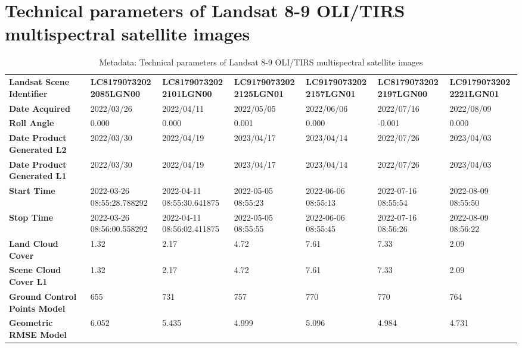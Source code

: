 \documentclass[climate,article,submit,pdftex,moreauthors]{Definitions/mdpi}
\begin{document}
\appendixstart
\appendix

\section[\appendixname~\thesection]{Technical parameters of Landsat 8-9 OLI/TIRS multispectral satellite images}

\begin{landscape}
\begin{table}
\caption{Metadata: Technical parameters of Landsat 8-9 OLI/TIRS multispectral satellite images}
 \label{tab01}
\footnotesize
\setlength\tabcolsep{2pt}
\begin{tabular}{|l|l|l|l|l|l|l|}    
      	\textbf{Landsat Scene Identifier} & \textbf{LC81790732022085LGN00} & \textbf{LC81790732022101LGN00} & \textbf{LC91790732022125LGN01} & \textbf{LC91790732022157LGN01} & \textbf{LC81790732022197LGN00} & \textbf{LC91790732022221LGN01} \\
        \textbf{Date Acquired} & 2022/03/26 & 2022/04/11 & 2022/05/05 & 2022/06/06 & 2022/07/16 & 2022/08/09 \\
        \textbf{Roll Angle} & 0.000 & 0.000 & 0.001 & 0.000 & -0.001 & 0.000 \\
        \textbf{Date Product Generated L2} & 2022/03/30 & 2022/04/19 & 2023/04/17 & 2023/04/14 & 2022/07/26 & 2023/04/03 \\
        \textbf{Date Product Generated L1} & 2022/03/30 & 2022/04/19 & 2023/04/17 & 2023/04/14 & 2022/07/26 & 2023/04/03 \\
        \textbf{Start Time} & 2022-03-26 08:55:28.788292 & 2022-04-11 08:55:30.641875 & 2022-05-05 08:55:23 & 2022-06-06 08:55:13 & 2022-07-16 08:55:54 & 2022-08-09 08:55:50 \\
        \textbf{Stop Time} & 2022-03-26 08:56:00.558292 & 2022-04-11 08:56:02.411875 & 2022-05-05 08:55:55 & 2022-06-06 08:55:45 & 2022-07-16 08:56:26 & 2022-08-09 08:56:22 \\
        \textbf{Land Cloud Cover} & 1.32 & 2.17 & 4.72 & 7.61 & 7.33 & 2.09 \\
        \textbf{Scene Cloud Cover L1} & 1.32 & 2.17 & 4.72 & 7.61 & 7.33 & 2.09 \\
        \textbf{Ground Control Points Model} & 655 & 731 & 757 & 770 & 770 & 764 \\
        \textbf{Geometric RMSE Model} & 6.052 & 5.435 & 4.999 & 5.096 & 4.984 & 4.731 \\

\end{tabular}
\end{table}
\end{landscape}
\end{document}
